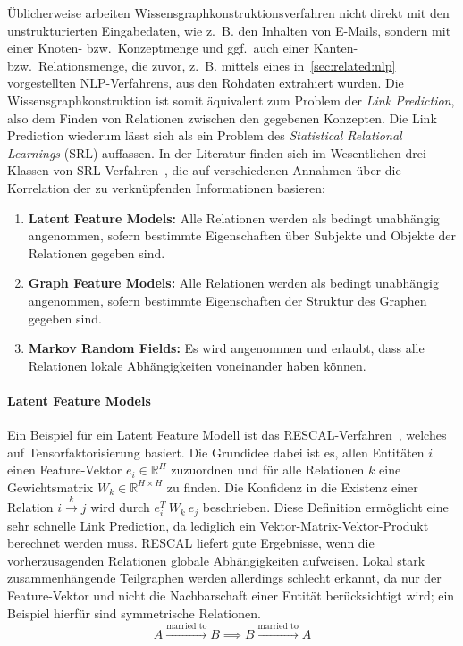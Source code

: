 Üblicherweise arbeiten Wissensgraphkonstruktionsverfahren nicht direkt mit den unstrukturierten Eingabedaten, wie z.~B. den Inhalten von E-Mails,
sondern mit einer Knoten- bzw.\ Konzeptmenge und ggf.\ auch einer Kanten- bzw.\ Relationsmenge, die zuvor, z.~B. mittels eines in~\ref{sec:related:nlp} vorgestellten NLP-Verfahrens, aus den Rohdaten extrahiert wurden.
Die Wissensgraphkonstruktion ist somit äquivalent zum Problem der \textit{Link Prediction}, also dem Finden von Relationen zwischen den gegebenen Konzepten.
Die Link Prediction wiederum lässt sich als ein Problem des \textit{Statistical Relational Learnings} (SRL) auffassen.
In der Literatur finden sich im Wesentlichen drei Klassen von SRL-Verfahren~\cite{Nickel2016}, die auf verschiedenen Annahmen über die Korrelation der zu verknüpfenden Informationen basieren:
\begin{enumerate}
	\item \textbf{Latent Feature Models:}
		Alle Relationen werden als bedingt unabhängig angenommen, sofern bestimmte Eigenschaften über Subjekte und Objekte der Relationen gegeben sind.
	\item \textbf{Graph Feature Models:}
		Alle Relationen werden als bedingt unabhängig angenommen, sofern bestimmte Eigenschaften der Struktur des Graphen gegeben sind.
	\item \textbf{Markov Random Fields:}
		Es wird angenommen und erlaubt, dass alle Relationen lokale Abhängigkeiten voneinander haben können.
\end{enumerate}

\paragraph{Latent Feature Models}
Ein Beispiel für ein Latent Feature Modell ist das RESCAL-Verfahren~\cite{Nickel2013}, welches auf Tensorfaktorisierung basiert.
Die Grundidee dabei ist es, allen Entitäten $i$ einen Feature-Vektor $e_i \in \mathbb{R}^H$ zuzuordnen und für alle Relationen $k$ eine Gewichtsmatrix $W_k \in \mathbb{R}^{H \times H}$ zu finden.
Die Konfidenz in die Existenz einer Relation $i \xrightarrow{k} j$ wird durch $e_i^T\ W_k\ e_j$ beschrieben.
Diese Definition ermöglicht eine sehr schnelle Link Prediction, da lediglich ein Vektor-Matrix-Vektor-Produkt berechnet werden muss.
RESCAL liefert gute Ergebnisse, wenn die vorherzusagenden Relationen globale Abhängigkeiten aufweisen.
Lokal stark zusammenhängende Teilgraphen werden allerdings schlecht erkannt, da nur der Feature-Vektor und nicht die Nachbarschaft einer Entität berücksichtigt wird;
ein Beispiel hierfür sind symmetrische Relationen.
\[A \xrightarrow{\text{married to}} B \implies B \xrightarrow{\text{married to}} A\]

